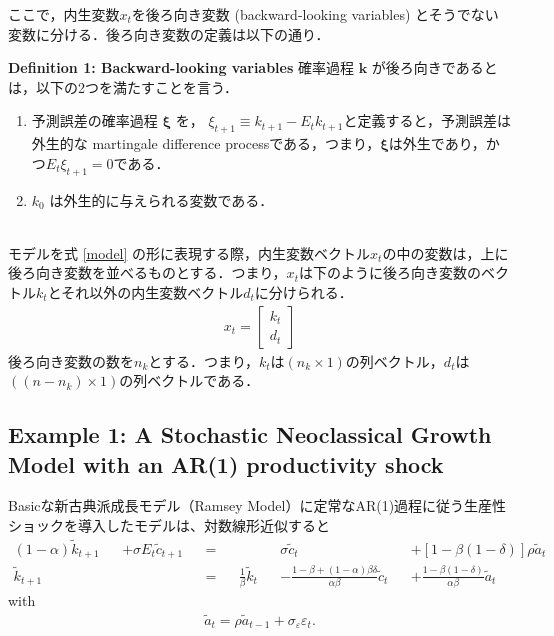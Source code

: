 \documentclass[a4j, dvipdfmx]{jarticle}
\begin{document}
ここで，内生変数$x_t$を後ろ向き変数 (backward-looking variables) とそうでない変数に分ける．後ろ向き変数の定義は以下の通り．\\

\begin{itembox}[l]{\bf{Definition 1: Backward-looking variables}}
確率過程 $\mathbf{k}$ が後ろ向きであるとは，以下の2つを満たすことを言う．
\begin{enumerate}
\item 予測誤差の確率過程 $\boldsymbol{\xi}$ を， $\xi_{t+1} \equiv k_{t+1} - E_tk_{t+1}$と定義すると，予測誤差は外生的な martingale difference processである，つまり，$\boldsymbol{\xi}$は外生であり，かつ$E_t\xi_{t+1} = 0$である．
\item $k_0$ は外生的に与えられる変数である．
\end{enumerate}
\end{itembox}\\

モデルを式 \eqref{model} の形に表現する際，内生変数ベクトル$x_t$の中の変数は，上に後ろ向き変数を並べるものとする．つまり，$x_t$は下のように後ろ向き変数のベクトル$k_t$とそれ以外の内生変数ベクトル$d_t$に分けられる．
\begin{align}
x_t = \begin{bmatrix}k_t \\ d_t\end{bmatrix}\label{xkd}
\end{align}
後ろ向き変数の数を$n_k$とする．つまり，$k_t$は$(n_k \times 1)$の列ベクトル，$d_t$は$((n-n_k)\times 1)$の列ベクトルである． 

\subsection{Example 1: A Stochastic Neoclassical Growth Model with an AR(1) productivity shock}
Basicな新古典派成長モデル（Ramsey Model）に定常なAR(1)過程に従う生産性ショックを導入したモデルは、対数線形近似すると
\begin{align}
[1-\beta(1-\delta)](1-\alpha)\tilde k_{t+1}& &+\sigma E_t\tilde c_{t+1}& &=& & & &\sigma \tilde c_t& &+[1-\beta(1-\delta)]\rho \tilde a_t\\
\tilde k_{t+1}& & & &=& &\frac{1}{\beta}\tilde k_t& &-\frac{1-\beta+(1-\alpha)\beta\delta}{\alpha\beta}\tilde c_t& &+\frac{1-\beta(1-\delta)}{\alpha\beta}\tilde a_t
\end{align}
with
\begin{align*}
\tilde a_t = \rho \tilde a_{t-1} + \sigma_\varepsilon \varepsilon_t.
\end{align*}
\end{document}
